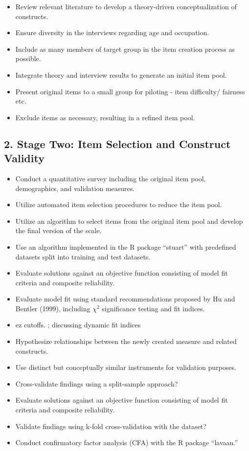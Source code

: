 \documentclass[
  12pt,
  a4paper,
  twoside]{article}
\providecommand{\tightlist}{%
  \setlength{\itemsep}{0pt}\setlength{\parskip}{0pt}}
\begin{document}
\begin{itemize}
\tightlist
\item
  Review relevant literature to develop a theory-driven conceptualization of constructs.
\item
  Ensure diversity in the interviews regarding age and occupation.
\item
  Include as many members of target group in the item creation process as possible.
\item
  Integrate theory and interview results to generate an initial item pool.
\item
  Present original items to a small group for piloting - item difficulty/ fairness etc.
\item
  Exclude items as necessary, resulting in a refined item pool.
\end{itemize}

\hypertarget{stage-two-item-selection-and-construct-validity}{%
\subsection{2. Stage Two: Item Selection and Construct Validity}\label{stage-two-item-selection-and-construct-validity}}

\begin{itemize}
\tightlist
\item
  Conduct a quantitative survey including the original item pool, demographics, and validation measures.
\item
  Utilize automated item selection procedures to reduce the item pool.
\item
  Utilize an algorithm to select items from the original item pool and develop the final version of the scale.
\item
  Use an algorithm implemented in the R package ``stuart'' with predefined datasets split into training and test datasets.
\item
  Evaluate solutions against an objective function consisting of model fit criteria and composite reliability.
\item
  Evaluate model fit using standard recommendations proposed by Hu and Bentler (1999), including \(\chi^2\) significance testing and fit indices.
\item
  ez cutoffs. ; discussing dynamic fit indices
\item
  Hypothesize relationships between the newly created measure and related constructs.
\item
  Use distinct but conceptually similar instruments for validation purposes.
\item
  Cross-validate findings using a split-sample approach?
\item
  Evaluate solutions against an objective function consisting of model fit criteria and composite reliability.
\item
  Validate findings using k-fold cross-validation with the dataset?
\item
  Conduct confirmatory factor analysis (CFA) with the R package ``lavaan.''
\end{itemize}
\end{document}
